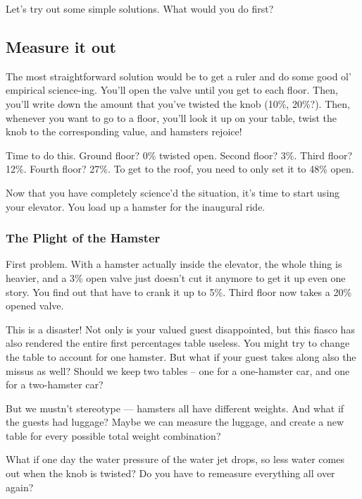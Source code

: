 \documentclass[]{article}
\begin{document}
Let's try out some simple solutions. What would you do first?

\hypertarget{measure-it-out}{%
\subsection{Measure it out}\label{measure-it-out}}

The most straightforward solution would be to get a ruler and do some good ol'
empirical science-ing. You'll open the valve until you get to each floor. Then,
you'll write down the amount that you've twisted the knob (10\%, 20\%?). Then,
whenever you want to go to a floor, you'll look it up on your table, twist the
knob to the corresponding value, and hamsters rejoice!

Time to do this. Ground floor? 0\% twisted open. Second floor? 3\%. Third floor?
12\%. Fourth floor? 27\%. To get to the roof, you need to only set it to 48\%
open.

Now that you have completely science'd the situation, it's time to start using
your elevator. You load up a hamster for the inaugural ride.

\hypertarget{the-plight-of-the-hamster}{%
\subsubsection{The Plight of the Hamster}\label{the-plight-of-the-hamster}}

First problem. With a hamster actually inside the elevator, the whole thing is
heavier, and a 3\% open valve just doesn't cut it anymore to get it up even one
story. You find out that have to crank it up to 5\%. Third floor now takes a
20\% opened valve.

This is a disaster! Not only is your valued guest disappointed, but this fiasco
has also rendered the entire first percentages table useless. You might try to
change the table to account for one hamster. But what if your guest takes along
also the missus as well? Should we keep two tables -- one for a one-hamster car,
and one for a two-hamster car?

But we mustn't stereotype --- hamsters all have different weights. And what if
the guests had luggage? Maybe we can measure the luggage, and create a new table
for every possible total weight combination?

What if one day the water pressure of the water jet drops, so less water comes
out when the knob is twisted? Do you have to remeasure everything all over
again?
\end{document}
